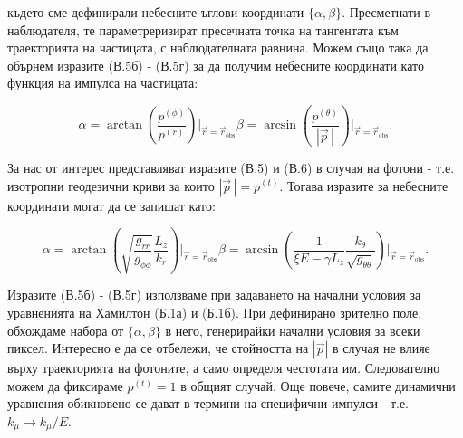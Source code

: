 \begin{appendices}
където сме дефинирали небесните ъглови координати $\{\alpha,\beta\}$. Пресметнати в наблюдателя, те параметреризират пресечната точка на тангентата към траекторията на частицата, с наблюдателната равнина. Можем също така да обърнем изразите (В.5б) - (В.5г) за да получим небесните координати като функция на импулса на частицата:

\begin{subequations}
	\begin{equation}
		\alpha = \arctan\left(\frac{p^{(\phi)}}{p^{(r)}}\right)\bigg\vert_{\vec{r} = \vec{r}_\text{obs}}
	\end{equation}
	\begin{equation}
		\beta = \arcsin\left(\frac{p^{(\theta)}}{|\vec{p}\,|}\right)\bigg\vert_{\vec{r} = \vec{r}_\text{obs}}.
	\end{equation}
\end{subequations}

За нас от интерес представляват изразите (В.5) и (В.6) в случая на фотони - т.е. изотропни геодезични криви за които $|\vec{p}\,| = p^{(t)}$. Тогава изразите за небесните координати могат да се запишат като:

\begin{subequations}
	\begin{equation}
		\alpha = \arctan\left(\sqrt{\frac{g_{rr}}{g_{\phi\phi}}}\frac{L_z}{k_r}\right)\bigg\vert_{\vec{r} = \vec{r}_\text{obs}}
	\end{equation}
	\begin{equation}
		\beta = \arcsin\left(\frac{1}{\xi E - \gamma L_z}\frac{k_\theta}{\sqrt{g_{\theta\theta}}}\right)\bigg\vert_{\vec{r} = \vec{r}_\text{obs}}.
	\end{equation}
\end{subequations}

Изразите (В.5б) - (В.5г) използваме при задаването на начални условия за уравненията на Хамилтон (Б.1а) и (Б.1б). При дефинирано зрително поле, обхождаме набора от $\{\alpha,\beta\}$ в него, генерирайки начални условия за всеки пиксел. Интересно е да се отбележи, че стойността на $|\vec{p}|$ в случая не влияе върху траекторията на фотоните, а само определя честотата им. Следователно можем да фиксираме $p^{(t)} = 1$ в общият случай. Още повече, самите динамични уравнения обикновено се дават в термини на специфични импулси - т.е. $k_\mu \rightarrow k_\mu / E$.

\end{appendices}
